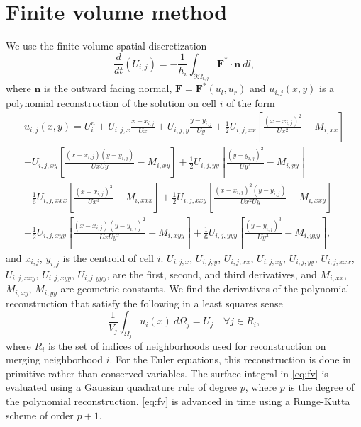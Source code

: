 
\section{Finite volume method}
We use the finite volume spatial discretization 
\begin{equation} \label{eq:fv}
\frac{d}{dt}(U_{i,j}) =  - \frac{1}{h_i} \int_{\partial \Omega_{i,j}} \mathbf{F}^* \cdot \mathbf{n}~dl,
\end{equation}
where $\mathbf{n}$ is the outward facing normal, $\mathbf{F} = \mathbf{F}^*(u_l,u_r)$ and $u_{i,j}(x,y)$ is a polynomial reconstruction of the solution on cell $i$ of the form
\begin{equation}\label{eq:u}
\begin{aligned}
	    u_{i,j}(x,y) = U^n_{i} +  U_{i,j,x}\frac{x- x_{i,j}}{U x} +   U_{i,j,y}\frac{y- y_{i,j}}{U y} + \frac{1}{2} U_{i,j, xx}\left[ \frac{(x -  x_{i,j})^2 }{U x^2} -  M_{i,xx}\right]\\
	    + U_{i,j, xy}\left[ \frac{(x -  x_{i,j}) (y -  y_{i,j}) }{U x U y} -  M_{i,xy}\right] + \frac{1}{2} U_{i,j, yy}\left[ \frac{(y -  y_{i,j})^2 }{U y^2} -   M_{i,yy}\right]\\
	     + \frac{1}{6}U_{i,j, xxx}\left[ \frac{(x -  x_{i,j})^3 }{U x^3} -  M_{i,xxx}\right] + \frac{1}{2}U_{i,j, xxy}\left[ \frac{(x -  x_{i,j})^2 (y -  y_{i,j}) }{U x^2 U y} -  M_{i,xxy}\right]\\
	     + \frac{1}{2}U_{i,j, xyy}\left[ \frac{(x -  x_{i,j}) (y -  y_{i,j})^2 }{U x U y ^2} -  M_{i,xyy}\right]+ \frac{1}{6}U_{i,j, yyy}\left[ \frac{(y -  y_{i,j})^3 }{U y^3} -  M_{i,yyy}\right],
\end{aligned}
\end{equation}
and $ x_{i,j}$, $ y_{i,j}$ is the centroid of cell $i$. $U_{i,j,x}$, $ U_{i,j,y}$, $ U_{i,j,xx}$, $ U_{i,j,xy}$, $ U_{i,j,yy}$, $ U_{i,j,xxx}$, $ U_{i,j,xxy}$, $ U_{i,j,xyy}$, $ U_{i,j,yyy}$, are the first, second, and third derivatives, and $  M_{i,xx}$, $ M_{i,xy}$,  $ M_{i,yy}$ are geometric constants. We find the derivatives of the polynomial reconstruction that satisfy the following in a least squares sense
\begin{equation}\label{eq:qi}
\frac{1}{ V_j}\int_{\Omega_j} u_i(x)~d\Omega_j = U_j \quad \forall j \in R_i,
\end{equation}
where $R_i$ is the set of indices of neighborhoods used for reconstruction on merging neighborhood $i$.  For the Euler equations, this reconstruction is done in primitive rather than conserved variables.  The surface integral in \eqref{eq:fv} is evaluated using a Gaussian quadrature rule of degree $p$, where $p$ is the degree of the polynomial reconstruction.  \eqref{eq:fv} is advanced in time using a Runge-Kutta scheme of order $p+1$.




